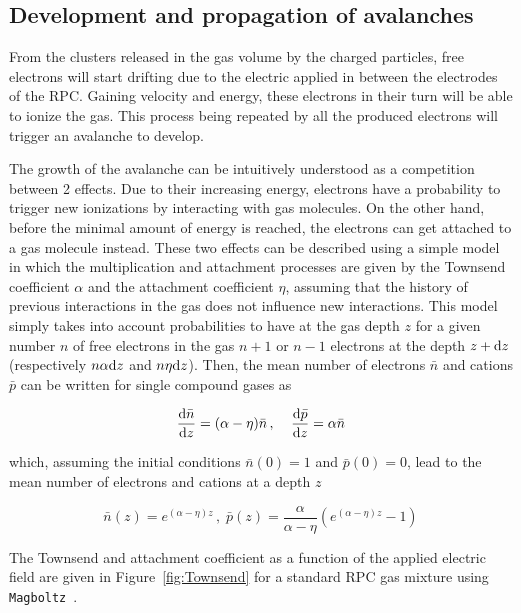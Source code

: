 	\subsection{Development and propagation of avalanches}
	\label{chapt4:ssec:avalanche}
	
	From the clusters released in the gas volume by the charged particles, free electrons will start drifting due to the electric applied in between the electrodes of the RPC. Gaining velocity and energy, these electrons in their turn will be able to ionize the gas. This process being repeated by all the produced electrons will trigger an avalanche to develop.
	
	The growth of the avalanche can be intuitively understood as a competition between 2 effects. Due to their increasing energy, electrons have a probability to trigger new ionizations by interacting with gas molecules. On the other hand, before the minimal amount of energy is reached, the electrons can get attached to a gas molecule instead. These two effects can be described using a simple model in which the multiplication and attachment processes are given by the Townsend coefficient $\alpha$ and the attachment coefficient $\eta$, assuming that the history of previous interactions in the gas does not influence new interactions. This model simply takes into account probabilities to have at the gas depth $z$ for a given number $n$ of free electrons in the gas $n+1$ or $n-1$ electrons  at the depth $z+\mathrm{d} z$ (respectively $n\alpha\mathrm{d} z$ and $n\eta\mathrm{d} z$). Then, the mean number of electrons $\bar{n}$ and cations $\bar{p}$ can be written for single compound gases as
	
	\begin{equation}
	\label{eq:townsend}
	\frac{\mathrm{d}\bar{n}}{\mathrm{d} z} = (\alpha - \eta)\bar{n} \, , \;\;\;\; \frac{\mathrm{d}\bar{p}}{\mathrm{d} z} = \alpha\bar{n}
	\end{equation}
	
	which, assuming the initial conditions $\bar{n}(0) = 1$ and $\bar{p}(0) = 0$, lead to the mean number of electrons and cations at a depth $z$
	
	\begin{equation}
	\label{eq:Townsend-avalanche}
	\bar{n}(z) = e^{(\alpha - \eta)z} \, , \; \bar{p}(z) = \frac{\alpha}{\alpha - \eta}\left( e^{(\alpha - \eta)z} - 1\right)
	\end{equation}
	
	The Townsend and attachment coefficient as a function of the applied electric field are given in Figure~\ref{fig:Townsend} for a standard RPC gas mixture using \texttt{Magboltz}~\cite{MAGBOLTZ}.
	
